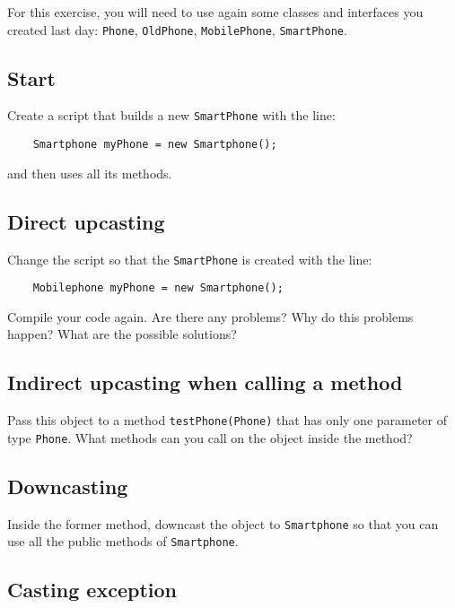 \documentclass{article}
\begin{document}
For this exercise, you will need to use again some classes and
interfaces you created last day: \verb+Phone+, \verb+OldPhone+,
\verb+MobilePhone+, \verb+SmartPhone+. 


\subsection{Start}

Create a script that builds a new \verb+SmartPhone+ with the line: 

\begin{verbatim}
    Smartphone myPhone = new Smartphone();
\end{verbatim}

and then uses all its methods. 

\subsection{Direct upcasting}
\label{sec:b}

Change the script so that the \verb+SmartPhone+ is created with the
line: 

\begin{verbatim}
    Mobilephone myPhone = new Smartphone();
\end{verbatim}

Compile your code again. Are there any problems? Why do this problems
happen? What are the possible solutions?

\subsection{Indirect upcasting when calling a method}
\label{sec:c}

Pass this object to a method \verb+testPhone(Phone)+ 
that has only one parameter of type
\verb+Phone+. What methods can you call on the object inside the method?

\subsection{Downcasting}
\label{sec:downcasting}

Inside the former method, downcast the object to \verb+Smartphone+ so
that you can use all the public methods of \verb+Smartphone+. 

\subsection{Casting exception}
\label{sec:casting-exception}
\end{document}
